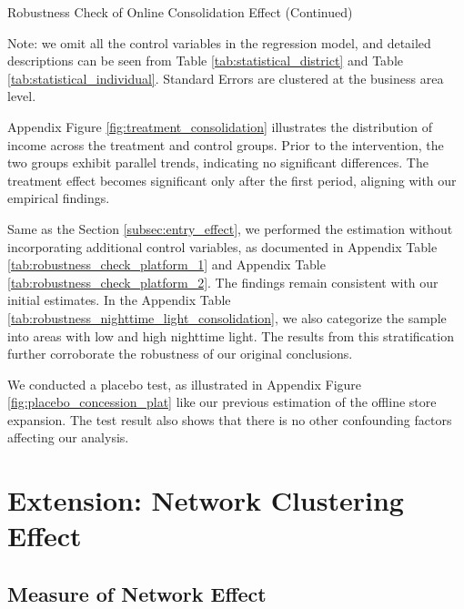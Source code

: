 \documentclass[11pt]{article}
\begin{document}
\begin{table}
  \begin{center}
    \begin{scriptsize}
      \caption{Robustness Check of Online Consolidation Effect (Continued)}
      \label{tab:heter_platform_did_2}
      
    
    Note: we omit all the control variables in the regression model, and detailed descriptions can be seen from Table \ref{tab:statistical_district} and Table \ref{tab:statistical_individual}. Standard Errors are clustered at the business area level.
    \end{scriptsize}
  \end{center}
\end{table}

Appendix Figure \ref{fig:treatment_consolidation} illustrates the distribution of income across the treatment and control groups. Prior to the intervention, the two groups exhibit parallel trends, indicating no significant differences. The treatment effect becomes significant only after the first period, aligning with our empirical findings. 

Same as the Section \ref{subsec:entry_effect}, we performed the estimation without incorporating additional control variables, as documented in Appendix Table \ref{tab:robustness_check_platform_1} and Appendix Table \ref{tab:robustness_check_platform_2}. The findings remain consistent with our initial estimates. In the Appendix Table \ref{tab:robustness_nighttime_light_consolidation}, we also categorize the sample into areas with low and high nighttime light. The results from this stratification further corroborate the robustness of our original conclusions.

We conducted a placebo test, as illustrated in Appendix Figure \ref{fig:placebo_concession_plat} like our previous estimation of the offline store expansion. The test result also shows that there is no other confounding factors affecting our analysis. 

\section{Extension: Network Clustering Effect} \label{sec:network_effect}

\subsection{Measure of Network Effect} \label{subsec:measure_network_effect}
\end{document}
